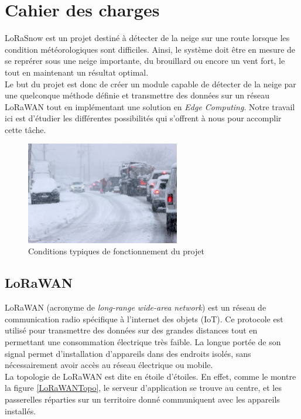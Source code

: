 \section{Cahier des charges}

LoRaSnow est un projet destiné à détecter de la neige sur une route lorsque les condition 
météorologiques sont difficiles. Ainsi, le système doit être en mesure de se reprérer sous une neige 
importante, du brouillard ou encore un vent fort, le tout en maintenant un résultat optimal.\\
Le but du projet est donc de créer un module capable de détecter de la neige par une quelconque méthode 
définie et transmettre des données sur un réseau LoRaWAN tout en implémentant une solution en 
\emph{Edge Computing}. Notre travail ici est d'étudier les différentes possibilités qui s'offrent à nous 
pour accomplir cette tâche.

\begin{figure}[H]
    \centering
    \includegraphics[width=0.6\textwidth]{Images/Illustration/ConditionDifficiles.jpg}
    \caption[]{Conditions typiques de fonctionnement du projet\footnotemark[1]}
    \label{ConditionDifficiles}
\end{figure}


\subsection{LoRaWAN}

LoRaWAN (acronyme de \emph{long-range wide-area network}) est un réseau de communication radio spécifique
à l'internet des objets (IoT). Ce protocole est utilisé pour transmettre des données sur des grandes 
distances tout en permettant une consommation électrique très faible. La longue portée de son signal 
permet d'installation d'appareils dans des endroits isolés, sans nécessairement avoir accès au réseau 
électrique ou mobile.\\
La topologie de LoRaWAN est dite en étoile d'étoiles. En effet, comme le montre la figure \ref{LoRaWANTopo},
le serveur d'application se trouve au centre, et les passerelles réparties sur un territoire donné 
communiquent avec les appareils installés.

